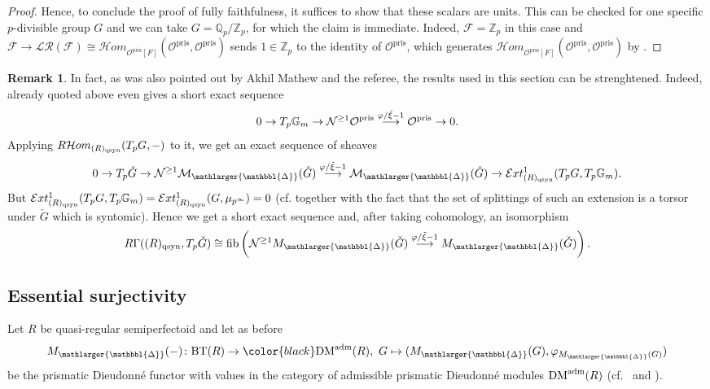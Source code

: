 \documentclass{amsart}
\newcommand{\prism}{{\mathlarger{\mathbbl{\Delta}}}}
\theoremstyle{plain}
\theoremstyle{definition}
\newtheorem{remark}[theorem]{Remark}
\newcommand{\pris}{\mathrm{pris}}
\newcommand{\Q}{\mathbb{Q}}
\newcommand{\tilxi}{\tilde{\xi}}
\newcommand{\Z}{\mathbb{Z}}
\newcommand{\red}[1]{{\color{black} #1}}
\newcommand{\blue}[1]{{\color{black}#1}}
\begin{document}
\begin{proof}
Hence, to conclude the proof of fully faithfulness, it suffices to show that these scalars are units. This can be checked for one specific $p$-divisible group $G$ and we can take $G=\Q_p/\Z_p$, for which the claim is immediate. Indeed, $\mathcal{F}=\Z_p$ in this case and $\mathcal{F}\to \mathcal{L}\mathcal{R}(\mathcal{F})\cong \mathcal{H}om_{\mathcal{O}^\pris[F]}(\mathcal{O}^\pris, \mathcal{O}^\pris)$ sends $1\in \Z_p$ to the identity of $\mathcal{O}^\pris$, which generates $\mathcal{H}om_{\mathcal{O}^\pris[F]}(\mathcal{O}^\pris, \mathcal{O}^\pris)$ by \cite[Remark 9.3]{bhatt_scholze_prisms_and_prismatic_cohomology}.
\end{proof}

\blue{
\begin{remark}
\label{cohomology-tate-module}
In fact, as was also pointed out by Akhil Mathew and the referee, the results used in this section can be strenghtened. Indeed, \cite[Theorem 7.5.6]{bhatt2022absolute} already quoted above even gives a short exact sequence
$$
0 \to T_p \mathbb{G}_m \to \mathcal{N}^{\geq 1} \mathcal{O}^{\rm pris} \overset{\varphi/\tilxi-1} \longrightarrow \mathcal{O}^{\rm pris} \to 0.
$$
Applying $R\mathcal{H}om_{(R)_{\rm qsyn}}(T_pG, -)$ to it, we get an exact sequence of sheaves
$$
0 \to T_p \check{G} \to \mathcal{N}^{\geq 1} \mathcal{M}_\prism(\check{G}) \overset{\varphi/\tilxi -1} \longrightarrow \mathcal{M}_\prism(\check{G}) \to \mathcal{E}xt_{(R)_{\rm qsyn}}^1(T_pG , T_p \mathbb{G}_m).
$$
But $\mathcal{E}xt_{(R)_{\rm qsyn}}^1(T_pG , T_p \mathbb{G}_m)=\mathcal{E}xt_{(R)_{\rm qsyn}}^1(G , \mu_{p^\infty})=0$ (cf. \cite[Theorem 1]{waterhouse1971principal} together with the fact that the set of splittings of such an extension is a torsor under $\check{G}$ which is syntomic). Hence we get a short exact sequence and, after taking cohomology, an isomorphism
$$
R\Gamma((R)_{\rm qsyn}, T_p\check{G}) \cong \mathrm{fib}\left(\mathcal{N}^{\geq 1} M_\prism(\check{G}) \overset{\varphi/\tilxi -1} \longrightarrow M_\prism(\check{G})\right).
$$
\end{remark}
}

\subsection{Essential surjectivity}
\label{sec:essent-surj-1}

Let $R$ be quasi-regular semiperfectoid and let as before
$$
M_\prism(-)\colon \mathrm{BT}(R)\to \red{\mathrm{DM}^{\rm adm}(R)},\ G\mapsto (M_\prism(G),\varphi_{M_\prism(G)})
$$
be the prismatic Dieudonn\'e functor with values in the category of \red{admissible prismatic Dieudonn\'e modules $\mathrm{DM}^{\rm adm}(R)$} (cf.\  and ).
\end{document}
